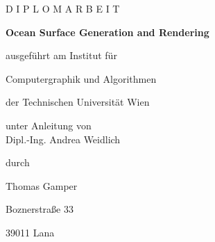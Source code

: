 




\begin{titlepage}
\setlength{\topmargin}{0cm}
\setlength{\footskip}{0cm}
\begin{center}



\vspace{2.9cm}

{\large \textsf{D I P L O M A R B E I T}} \vspace{1cm}

{\Huge \textsf{\textbf{Ocean Surface Generation and Rendering}}} \vspace{1cm}

\textsf{ausgef\"{u}hrt am Institut f\"{u}r} \vspace{0.1cm}

{\large \textsf{Computergraphik und Algorithmen} \\} \vspace{0.1cm}

\textsf{der Technischen Universit\"{a}t Wien} \vspace{1cm}

\textsf{unter Anleitung von \\
{\large	Dipl.-Ing. Andrea Weidlich}
\vspace{1cm}
}


\textsf{durch
\vspace{0.2cm}%
}


{\large \textsf{Thomas Gamper}} \\
\vspace{0.2cm}%

\textsf{Boznerstra\ss e 33}

\textsf{39011 Lana}


\end{center}
\end{titlepage}
